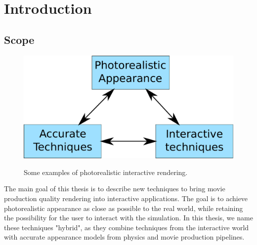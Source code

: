 \chapter{Introduction}



\label{sec:intro}
\section{Scope}

\begin{figure}
\centering
	 \includegraphics[draft,width=\textwidth]{figures/main_diagram}  \\
\caption{Some examples of photorealistic interactive rendering.} 
\label{fig:main_examples}
\end{figure}

The main goal of this thesis is to describe new techniques to bring movie production quality rendering into interactive applications.  The goal is to achieve photorealistic appearance as close as possible to the real world, while retaining the possibility for the user to interact with the simulation. In this thesis, we name these techniques "hybrid", as they combine techniques from the interactive world with accurate appearance models from physics and movie production pipelines.


